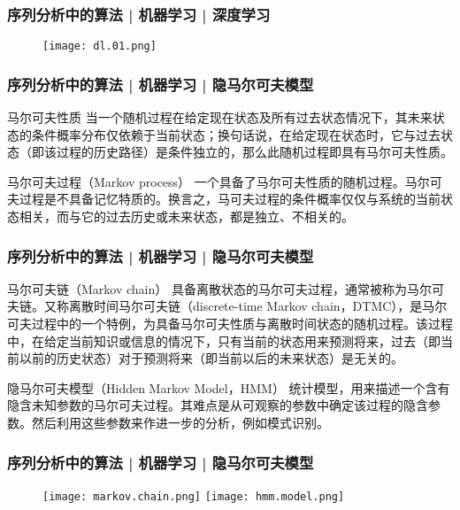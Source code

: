 \begin{frame}
  \frametitle{序列分析中的算法 | 机器学习 | 深度学习}
  \begin{figure}
    \centering
    \texttt{[image: dl.01.png]}
  \end{figure}
\end{frame}

\begin{frame}
  \frametitle{序列分析中的算法 | 机器学习 | 隐马尔可夫模型}
  \begin{block}{马尔可夫性质}
    当一个随机过程在给定现在状态及所有过去状态情况下，其未来状态的条件概率分布仅依赖于当前状态；换句话说，在给定现在状态时，它与过去状态（即该过程的历史路径）是条件独立的，那么此随机过程即具有马尔可夫性质。
  \end{block}
  \pause
  \begin{block}{马尔可夫过程（Markov process）}
    一个具备了马尔可夫性质的随机过程。马尔可夫过程是不具备记忆特质的。换言之，马可夫过程的条件概率仅仅与系统的当前状态相关，而与它的过去历史或未来状态，都是独立、不相关的。
  \end{block}
\end{frame}

\begin{frame}
  \frametitle{序列分析中的算法 | 机器学习 | 隐马尔可夫模型}
  \begin{block}{马尔可夫链（Markov chain）}
    具备离散状态的马尔可夫过程，通常被称为马尔可夫链。又称离散时间马尔可夫链（discrete-time Markov chain，DTMC），是马尔可夫过程中的一个特例，为具备马尔可夫性质与离散时间状态的随机过程。该过程中，在给定当前知识或信息的情况下，只有当前的状态用来预测将来，过去（即当前以前的历史状态）对于预测将来（即当前以后的未来状态）是无关的。
  \end{block}
  \pause
  \begin{block}{隐马尔可夫模型（Hidden Markov Model，HMM）}
    统计模型，用来描述一个含有隐含未知参数的马尔可夫过程。其难点是从可观察的参数中确定该过程的隐含参数。然后利用这些参数来作进一步的分析，例如模式识别。
  \end{block}
\end{frame}

\begin{frame}
  \frametitle{序列分析中的算法 | 机器学习 | 隐马尔可夫模型}
  \begin{figure}
    \centering
    \texttt{[image: markov.chain.png]}
    \quad
    \texttt{[image: hmm.model.png]}
  \end{figure}
\end{frame}

